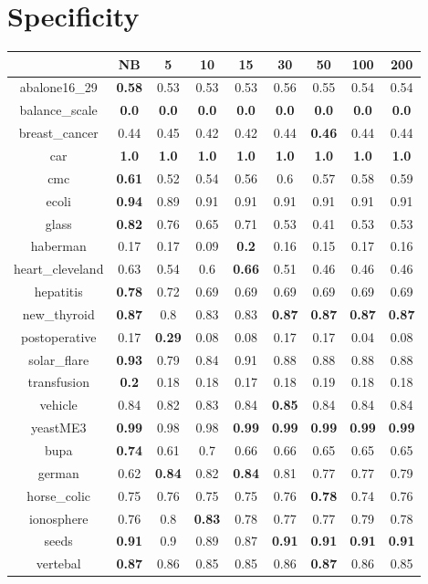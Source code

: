 \documentclass{article}%
\begin{document}
%
\section*{Specificity}%
\begin{tabular}{c|cccccccc}%
\hline%
&NB&5&10&15&30&50&100&200\\%
\hline%
abalone16\_29&\textbf{0.58}&0.53&0.53&0.53&0.56&0.55&0.54&0.54\\%
\hline%
balance\_scale&\textbf{0.0}&\textbf{0.0}&\textbf{0.0}&\textbf{0.0}&\textbf{0.0}&\textbf{0.0}&\textbf{0.0}&\textbf{0.0}\\%
\hline%
breast\_cancer&0.44&0.45&0.42&0.42&0.44&\textbf{0.46}&0.44&0.44\\%
\hline%
car&\textbf{1.0}&\textbf{1.0}&\textbf{1.0}&\textbf{1.0}&\textbf{1.0}&\textbf{1.0}&\textbf{1.0}&\textbf{1.0}\\%
\hline%
cmc&\textbf{0.61}&0.52&0.54&0.56&0.6&0.57&0.58&0.59\\%
\hline%
ecoli&\textbf{0.94}&0.89&0.91&0.91&0.91&0.91&0.91&0.91\\%
\hline%
glass&\textbf{0.82}&0.76&0.65&0.71&0.53&0.41&0.53&0.53\\%
\hline%
haberman&0.17&0.17&0.09&\textbf{0.2}&0.16&0.15&0.17&0.16\\%
\hline%
heart\_cleveland&0.63&0.54&0.6&\textbf{0.66}&0.51&0.46&0.46&0.46\\%
\hline%
hepatitis&\textbf{0.78}&0.72&0.69&0.69&0.69&0.69&0.69&0.69\\%
\hline%
new\_thyroid&\textbf{0.87}&0.8&0.83&0.83&\textbf{0.87}&\textbf{0.87}&\textbf{0.87}&\textbf{0.87}\\%
\hline%
postoperative&0.17&\textbf{0.29}&0.08&0.08&0.17&0.17&0.04&0.08\\%
\hline%
solar\_flare&\textbf{0.93}&0.79&0.84&0.91&0.88&0.88&0.88&0.88\\%
\hline%
transfusion&\textbf{0.2}&0.18&0.18&0.17&0.18&0.19&0.18&0.18\\%
\hline%
vehicle&0.84&0.82&0.83&0.84&\textbf{0.85}&0.84&0.84&0.84\\%
\hline%
yeastME3&\textbf{0.99}&0.98&0.98&\textbf{0.99}&\textbf{0.99}&\textbf{0.99}&\textbf{0.99}&\textbf{0.99}\\%
\hline%
bupa&\textbf{0.74}&0.61&0.7&0.66&0.66&0.65&0.65&0.65\\%
\hline%
german&0.62&\textbf{0.84}&0.82&\textbf{0.84}&0.81&0.77&0.77&0.79\\%
\hline%
horse\_colic&0.75&0.76&0.75&0.75&0.76&\textbf{0.78}&0.74&0.76\\%
\hline%
ionosphere&0.76&0.8&\textbf{0.83}&0.78&0.77&0.77&0.79&0.78\\%
\hline%
seeds&\textbf{0.91}&0.9&0.89&0.87&\textbf{0.91}&\textbf{0.91}&\textbf{0.91}&\textbf{0.91}\\%
\hline%
vertebal&\textbf{0.87}&0.86&0.85&0.85&0.86&\textbf{0.87}&0.86&0.85\\%
\hline%
\end{tabular}
\end{document}
